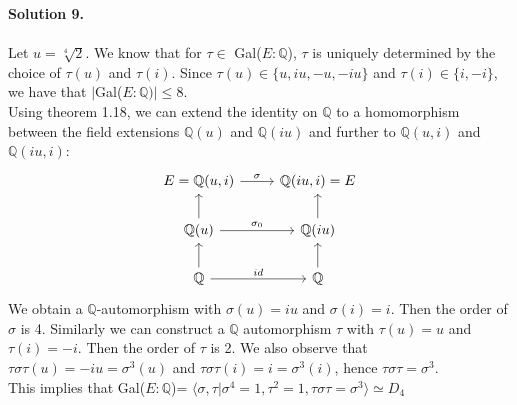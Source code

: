 \documentclass[12pt,a4paper]{article}
\begin{document}
\textbf{Solution 9.}\\
\\
Let $u=\sqrt[4]{2}$. We know that for $\tau \in$ Gal($E:\mathbb{Q}$), $\tau$ is uniquely determined by the choice of $\tau(u)$ and $\tau(i)$. Since $\tau(u)\in \{u, iu, -u, -iu\}$ and $\tau(i)\in \{i, -i\}$, we have that $|$Gal($E:\mathbb{Q})|\leq 8$.\\ 
Using theorem 1.18, we can extend the identity on $\mathbb{Q}$ to a homomorphism between the field extensions $\mathbb{Q}(u)$ and $\mathbb{Q}(iu)$ and further to $\mathbb{Q}(u,i)$ and $\mathbb{Q}(iu,i)$: 
\begin{equation*}
\begin{tikzcd}
E=\mathbb{Q}(u,i) \arrow[r, "\sigma"] & \mathbb{Q}(iu,i) =E \\
\mathbb{Q}(u) \arrow [u] \arrow [r, "\sigma_0"] & \mathbb{Q}(iu)\arrow[u] \\
\mathbb{Q} \arrow[u] \arrow[r, "id"] & \mathbb{Q} \arrow[u]
\end{tikzcd}
\end{equation*}
We obtain a $\mathbb{Q}$-automorphism with $\sigma(u)=iu$ and $\sigma(i)=i$. Then the order of $\sigma$ is 4. Similarly we can construct a $\mathbb{Q}$ automorphism $\tau$ with $\tau(u)=u$ and $\tau(i)=-i$. Then the order of $\tau$ is 2. We also observe that $\tau\sigma\tau(u)=-iu=\sigma^3(u)$ and $\tau\sigma\tau(i)= i = \sigma^3(i)$, hence $\tau\sigma\tau = \sigma^3$.\\
This implies that Gal($E:\mathbb{Q}$)= $\langle \sigma, \tau | \sigma^4=1, \tau^2=1, \tau\sigma\tau = \sigma^3\rangle\simeq D_4$
\end{document}
